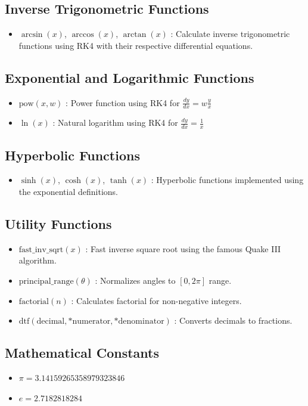 \documentclass[journal]{IEEEtran}
\numberwithin{equation}{enumi}
\numberwithin{figure}{enumi}
\begin{document}
\subsection{Inverse Trigonometric Functions}
\begin{itemize}
    \item $\arcsin(x)$, $\arccos(x)$, $\arctan(x)$ : Calculate inverse trigonometric functions using RK4 with their respective differential equations.
\end{itemize}

\subsection{Exponential and Logarithmic Functions}
\begin{itemize}
    \item $\text{pow}(x, w)$ : Power function using RK4 for $\frac{dy}{dx} = w\frac{y}{x}$
    \item $\ln(x)$ : Natural logarithm using RK4 for $\frac{dy}{dx} = \frac{1}{x}$
\end{itemize}

\subsection{Hyperbolic Functions}
\begin{itemize}
    \item $\sinh(x)$, $\cosh(x)$, $\tanh(x)$ : Hyperbolic functions implemented using the exponential definitions.
\end{itemize}

\subsection{Utility Functions}
\begin{itemize}
    \item $\text{fast\_inv\_sqrt}(x)$ : Fast inverse square root using the famous Quake III algorithm.
    \item $\text{principal\_range}(\theta)$ : Normalizes angles to $[0, 2\pi]$ range.
    \item $\text{factorial}(n)$ : Calculates factorial for non-negative integers.
    \item $\text{dtf}(\text{decimal}, *\text{numerator}, *\text{denominator})$ : Converts decimals to fractions.
\end{itemize}

\subsection{Mathematical Constants}
\begin{itemize}
    \item $\pi = 3.14159265358979323846$
    \item $e = 2.7182818284$
\end{itemize}
\end{document}
